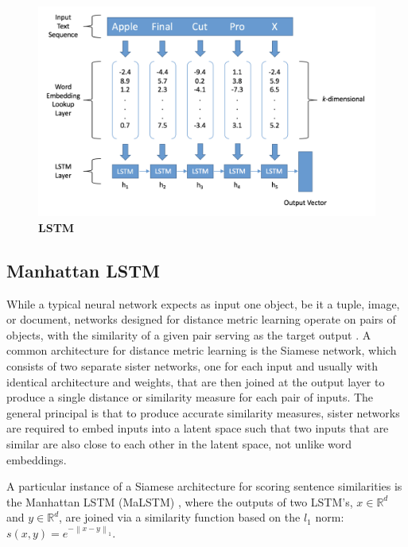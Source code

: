 \documentclass{proc}
\begin{document}
\begin{figure}
	\includegraphics[scale=0.35]{../imgs/word-embeddings-lstm.png}
	\caption{\textbf{LSTM}}
	\label{fig:word-embeddings-lstm}
\end{figure}

\subsection{Manhattan LSTM}

While a typical neural network expects as input one object, be it a tuple, image, or document, networks designed for distance metric learning operate on pairs of objects, with the similarity of a given pair serving as the target output \cite{yang-distance}. A common architecture for distance metric learning is the Siamese network, which consists of two separate sister networks, one for each input and usually with identical architecture and weights, that are then joined at the output layer to produce a single distance or similarity measure for each pair of inputs. The general principal is that to produce accurate similarity measures, sister networks are required to embed inputs into a latent space such that two inputs that are similar are also close to each other in the latent space, not unlike word embeddings.

A particular instance of a Siamese architecture for scoring sentence similarities is the Manhattan LSTM (MaLSTM) \cite{mueller-siamese}, where the outputs of two LSTM's, $x \in \mathbb{R}^d$ and $y \in \mathbb{R}^d$, are joined via a similarity function based on the $l_1$ norm: $s(x, y) = e^{-\left\|x - y\right\|_1}$.
\end{document}

